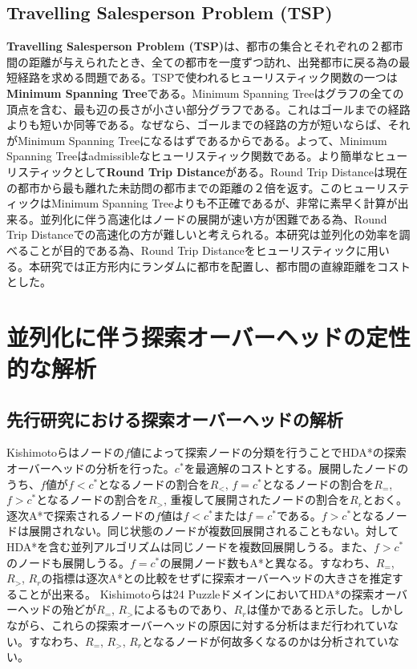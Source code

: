 \documentclass[uplatex]{jsarticle}
\begin{document}
\subsection{Travelling Salesperson Problem (TSP)}
\textbf{Travelling Salesperson Problem (TSP)}は、都市の集合とそれぞれの２都市間の距離が与えられたとき、全ての都市を一度ずつ訪れ、出発都市に戻る為の最短経路を求める問題である。TSPで使われるヒューリスティック関数の一つは\textbf{Minimum Spanning Tree}である。Minimum Spanning Treeはグラフの全ての頂点を含む、最も辺の長さが小さい部分グラフである。これはゴールまでの経路よりも短いか同等である。なぜなら、ゴールまでの経路の方が短いならば、それがMinimum Spanning Treeになるはずであるからである。よって、Minimum Spanning Treeはadmissibleなヒューリスティック関数である。より簡単なヒューリスティックとして\textbf{Round Trip Distance}がある。Round Trip Distanceは現在の都市から最も離れた未訪問の都市までの距離の２倍を返す。このヒューリスティックはMinimum Spanning Treeよりも不正確であるが、非常に素早く計算が出来る。並列化に伴う高速化はノードの展開が速い方が困難である為、Round Trip Distanceでの高速化の方が難しいと考えられる。本研究は並列化の効率を調べることが目的である為、Round Trip Distanceをヒューリスティックに用いる。本研究では正方形内にランダムに都市を配置し、都市間の直線距離をコストとした。

\newpage

\section{並列化に伴う探索オーバーヘッドの定性的な解析}
\label{sec:analysis1}

\subsection{先行研究における探索オーバーヘッドの解析}
Kishimotoらはノードの$f$値によって探索ノードの分類を行うことでHDA*の探索オーバーヘッドの分析を行った\cite{Kishimoto2013}。$c^*$を最適解のコストとする。展開したノードのうち、$f$値が$f < c^*$となるノードの割合を$R_{<}$, $f = c^*$となるノードの割合を$R_{=}$, $f > c^*$となるノードの割合を$R_{>}$, 重複して展開されたノードの割合を$R_{r}$とおく。逐次A*で探索されるノードの$f$値は$f < c^*$または$f = c^*$である。$f > c^*$となるノードは展開されない。同じ状態のノードが複数回展開されることもない。対してHDA*を含む並列アルゴリズムは同じノードを複数回展開しうる。また、$f > c^*$のノードも展開しうる。$f = c^*$の展開ノード数もA*と異なる。すなわち、$R_{=}$, $R_{>}$, $R_{r}$の指標は逐次A*との比較をせずに探索オーバーヘッドの大きさを推定することが出来る。
Kishimotoらは24 PuzzleドメインにおいてHDA*の探索オーバーヘッドの殆どが$R_{=}$, $R_{>}$によるものであり、$R_{r}$は僅かであると示した。しかしながら、これらの探索オーバーヘッドの原因に対する分析はまだ行われていない。すなわち、$R_{=}$, $R_{>}$, $R_{r}$となるノードが何故多くなるのかは分析されていない。
\end{document}
